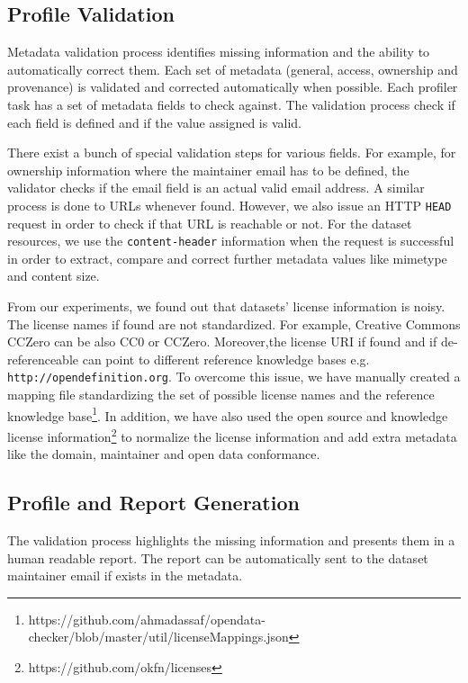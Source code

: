 \documentclass{sig-alternate}
\begin{document}
\subsection{Profile Validation}

Metadata validation process identifies missing information and the ability to automatically correct them. Each set of metadata (general, access, ownership and provenance) is validated and corrected automatically when possible. Each profiler task has a set of metadata fields to check against. The validation process check if each field is defined and if the value assigned is valid.

There exist a bunch of special validation steps for various fields. For example, for ownership information where the maintainer email has to be defined, the validator checks if the email field is an actual valid email address. A similar process is done to URLs whenever found. However, we also issue an HTTP \texttt{HEAD} request in order to check if that URL is reachable or not. For the dataset resources, we use the \texttt{content-header} information when the request is successful in order to extract, compare and correct further metadata values like mimetype and content size.

From our experiments, we found out that datasets' license information is noisy. The license names if found are not standardized. For example, Creative Commons CCZero can be also CC0 or CCZero. Moreover,the license URI if found and if de-referenceable can point to different reference knowledge bases e.g. \texttt{http://opendefinition.org}. To overcome this issue, we have manually created a mapping file standardizing the set of possible license names and the reference knowledge base\footnote{https://github.com/ahmadassaf/opendata-checker/blob/master/util/licenseMappings.json}. In addition, we have also used the open source and knowledge license information\footnote{https://github.com/okfn/licenses} to normalize the license information and add extra metadata like the domain, maintainer and open data conformance.

\subsection{Profile and Report Generation}

The validation process highlights the missing information and presents them in a human readable report. The report can be automatically sent to the dataset maintainer email if exists in the metadata.
\end{document}
